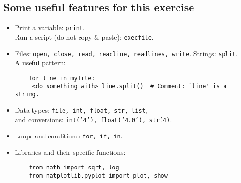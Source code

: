 \documentclass[a4paper,11pt]{article}
\begin{document}
\subsection{Some useful features for this exercise}
\begin{itemize}
\item Print a variable: \texttt{print}. \\
    Run a script (do not copy \& paste): \texttt{execfile}.
\item Files: \texttt{open, close, read, readline, readlines, write}. Strings: \texttt{split}. \\
      A useful pattern:
	\begin{verbatim}
	for line in myfile:
     <do something with> line.split()  # Comment: `line' is a string.
	\end{verbatim}
\item Data types: \texttt{file, int, float, str, list}, \\
	  	and conversions: \texttt{int('4'), float('4.0'), str(4)}.
\item Loops and conditions: \texttt{for, if, in}.
\item Libraries and their specific functions: 
	\begin{verbatim}
	from math import sqrt, log
	from matplotlib.pyplot import plot, show
	\end{verbatim}
\end{itemize}
\end{document}
